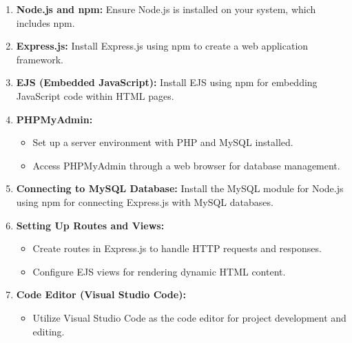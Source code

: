 \documentclass[12pt,a4paper]{report}
\begin{document}
\begin{enumerate}
    \item \textbf{Node.js and npm:}
    Ensure Node.js is installed on your system, which includes npm.

    \item \textbf{Express.js:}
    Install Express.js using npm to create a web application framework.

    \item \textbf{EJS (Embedded JavaScript):}
    Install EJS using npm for embedding JavaScript code within HTML pages.

    \item \textbf{PHPMyAdmin:}
    \begin{itemize}
        \item Set up a server environment with PHP and MySQL installed.
        \item Access PHPMyAdmin through a web browser for database management.
    \end{itemize}

    \item \textbf{Connecting to MySQL Database:}
    Install the MySQL module for Node.js using npm for connecting Express.js
    with MySQL databases.

    \item \textbf{Setting Up Routes and Views:}
    \begin{itemize}
        \item Create routes in Express.js to handle HTTP requests and responses.
        \item Configure EJS views for rendering dynamic HTML content.
    \end{itemize}

    \item \textbf{Code Editor (Visual Studio Code):}
    \begin{itemize}
        \item Utilize Visual Studio Code as the code editor for project development
        and editing.
    \end{itemize}
\end{enumerate}
\end{document}
